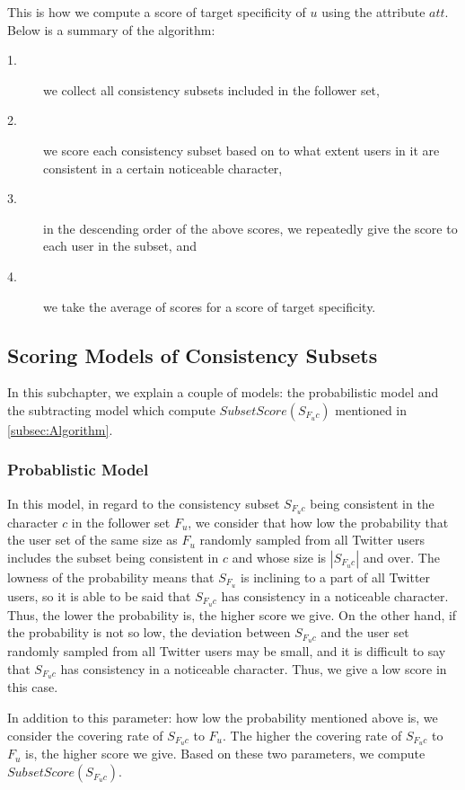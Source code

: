 This is how we compute a score of target specificity of $u$ using the
attribute $\mathit{att}$.  Below is a summary of the algorithm:

\begin{description}
\item[1.]  we collect all consistency subsets included in the follower set,
\item[2.]  we score each consistency subset based on to what extent users
           in it are consistent in a certain noticeable character,
\item[3.]  in the descending order of the above scores, we repeatedly
           give the score to each user in the subset, and
\item[4.]  we take the average of scores for a score of target specificity.
\end{description}

\subsection{Scoring Models of Consistency Subsets}
\label{subsec:Scoring}

In this subchapter, we explain a couple of models: the
probabilistic model and the subtracting model which compute
$\mathit{SubsetScore(S_{F_uc})}$ mentioned in \ref{subsec:Algorithm}.

\subsubsection{Probablistic Model}
\label{subsubsec:Probablistic}

In this model, in regard to the consistency subset $S_{F_uc}$ being
consistent in the character $c$ in the follower set $F_u$, we consider
that how low the probability that the user set of the same size as $F_u$
randomly sampled from all Twitter users includes the subset
being consistent in $c$ and whose size is $|S_{F_uc}|$ and over.
The lowness of the probability means that $S_{F_u}$ is inclining to
a part of all Twitter users, so it is able to be said that
$S_{F_uc}$ has consistency in a noticeable character.  Thus, the lower
the probability is, the higher score we give.
On the other hand, if the probability is
not so low,  the deviation between $S_{F_uc}$ and the user set randomly
sampled from all Twitter users may be small, and it is difficult to say
that $S_{F_uc}$ has consistency in a noticeable character.  Thus, we
give a low score in this case.

In addition to this parameter: how low the probability mentioned above
is, we consider the covering rate of $S_{F_uc}$ to $F_u$.  The higher
the covering rate of $S_{F_uc}$ to $F_u$ is, the higher score we give.
Based on these two parameters, we compute $\mathit{SubsetScore(S_{F_uc})}$.

